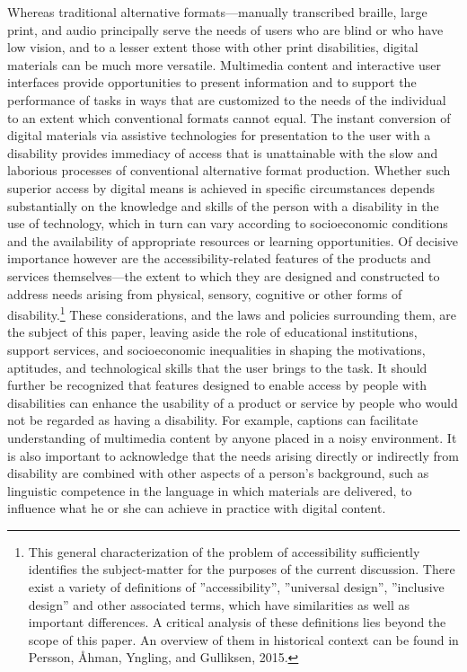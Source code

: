 \documentclass{sig-alternate} %
\begin{document}
\begin{large}
Whereas traditional alternative formats—manu\-ally transcribed braille, large print, and audio principally serve the needs
of users who are blind or who have low vision, and to a lesser extent those with other print disabilities, digital materials can be much more versatile. Multimedia content and interactive user interfaces provide opportunities to present information and to support the performance of tasks in ways that are customized to the needs of the individual to an extent which conventional formats cannot equal. The instant conversion of digital materials via assistive technologies for presentation to the user with a disability provides immediacy of access that is unattainable with the slow and laborious processes of conventional alternative format production. Whether such superior access by digital means is achieved in specific circumstances depends substantially on the knowledge and skills of the person with a disability in the use of technology, which in turn can vary according to socioeconomic conditions and the availability of appropriate resources or learning opportunities. Of decisive importance however are the accessibility-related features of the products and services themselves—the extent to which they are designed and constructed to address needs arising from physical, sensory, cognitive or other forms of disability.\footnote{This general characterization of the problem of accessibility sufficiently identifies the subject-matter for the purposes of the current discussion. There exist a variety of definitions of ”accessibility”, ”universal design”, ”inclusive design” and other associated terms, which have similarities as well as important differences. A critical analysis of these definitions lies beyond the scope of this paper. An overview of them in historical context can be found in Persson, Åhman, Yngling, and Gulliksen, 2015.} These considerations, and the laws and policies surrounding them, are the subject of this paper, leaving aside the role of educational institutions, support services, and socioeconomic inequalities in shaping the motivations, aptitudes, and technological skills that the user brings to the task. It should further be recognized that features designed to enable access by people with disabilities can enhance the usability of a product or service by people who would not be regarded as having a disability. For example, captions can facilitate understanding of multimedia content by anyone placed in a noisy environment. It is also important to acknowledge that the needs arising directly or indirectly from disability are combined with other aspects of a person’s background, such as linguistic competence in the language in which materials are delivered, to influence what he or she can achieve in practice with digital content.


\end{large}
\end{document}
